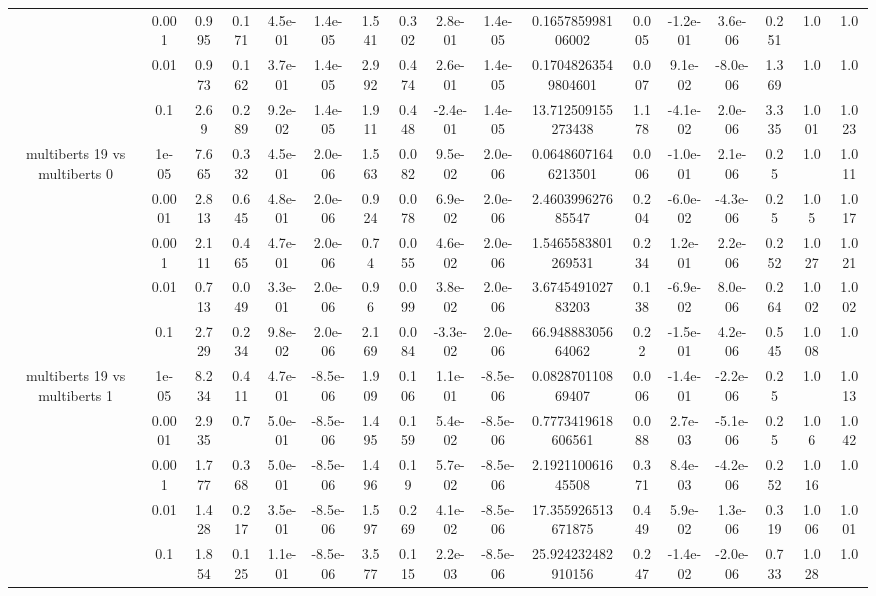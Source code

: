 \begin{tabular}{|c|c|c|c|c|c|c|c|c|c|c|c|c|c|c|c|c|}
 & 0.001 & 0.995 & 0.171 & 4.5e-01 & 1.4e-05 & 1.541 & 0.302 & 2.8e-01 & 1.4e-05 & 0.165785998106002 & 0.005 & -1.2e-01 & 3.6e-06 & 0.251 & 1.0 & 1.0 \\
 & 0.01 & 0.973 & 0.162 & 3.7e-01 & 1.4e-05 & 2.992 & 0.474 & 2.6e-01 & 1.4e-05 & 0.17048263549804601 & 0.007 & 9.1e-02 & -8.0e-06 & 1.369 & 1.0 & 1.0 \\
 & 0.1 & 2.69 & 0.289 & 9.2e-02 & 1.4e-05 & 1.911 & 0.448 & -2.4e-01 & 1.4e-05 & 13.712509155273438 & 1.178 & -4.1e-02 & 2.0e-06 & 3.335 & 1.001 & 1.023 \\
\hline
\multirow{5}{*}{multiberts 19 vs multiberts 0} & 1e-05 & 7.665 & 0.332 & 4.5e-01 & 2.0e-06 & 1.563 & 0.082 & 9.5e-02 & 2.0e-06 & 0.06486071646213501 & 0.006 & -1.0e-01 & 2.1e-06 & 0.25 & 1.0 & 1.011 \\
 & 0.0001 & 2.813 & 0.645 & 4.8e-01 & 2.0e-06 & 0.924 & 0.078 & 6.9e-02 & 2.0e-06 & 2.460399627685547 & 0.204 & -6.0e-02 & -4.3e-06 & 0.25 & 1.05 & 1.017 \\
 & 0.001 & 2.111 & 0.465 & 4.7e-01 & 2.0e-06 & 0.74 & 0.055 & 4.6e-02 & 2.0e-06 & 1.5465583801269531 & 0.234 & 1.2e-01 & 2.2e-06 & 0.252 & 1.027 & 1.021 \\
 & 0.01 & 0.713 & 0.049 & 3.3e-01 & 2.0e-06 & 0.96 & 0.099 & 3.8e-02 & 2.0e-06 & 3.674549102783203 & 0.138 & -6.9e-02 & 8.0e-06 & 0.264 & 1.002 & 1.002 \\
 & 0.1 & 2.729 & 0.234 & 9.8e-02 & 2.0e-06 & 2.169 & 0.084 & -3.3e-02 & 2.0e-06 & 66.94888305664062 & 0.22 & -1.5e-01 & 4.2e-06 & 0.545 & 1.008 & 1.0 \\
\hline
\multirow{5}{*}{multiberts 19 vs multiberts 1} & 1e-05 & 8.234 & 0.411 & 4.7e-01 & -8.5e-06 & 1.909 & 0.106 & 1.1e-01 & -8.5e-06 & 0.082870110869407 & 0.006 & -1.4e-01 & -2.2e-06 & 0.25 & 1.0 & 1.013 \\
 & 0.0001 & 2.935 & 0.7 & 5.0e-01 & -8.5e-06 & 1.495 & 0.159 & 5.4e-02 & -8.5e-06 & 0.7773419618606561 & 0.088 & 2.7e-03 & -5.1e-06 & 0.25 & 1.06 & 1.042 \\
 & 0.001 & 1.777 & 0.368 & 5.0e-01 & -8.5e-06 & 1.496 & 0.19 & 5.7e-02 & -8.5e-06 & 2.192110061645508 & 0.371 & 8.4e-03 & -4.2e-06 & 0.252 & 1.016 & 1.0 \\
 & 0.01 & 1.428 & 0.217 & 3.5e-01 & -8.5e-06 & 1.597 & 0.269 & 4.1e-02 & -8.5e-06 & 17.355926513671875 & 0.449 & 5.9e-02 & 1.3e-06 & 0.319 & 1.006 & 1.001 \\
 & 0.1 & 1.854 & 0.125 & 1.1e-01 & -8.5e-06 & 3.577 & 0.115 & 2.2e-03 & -8.5e-06 & 25.924232482910156 & 0.247 & -1.4e-02 & -2.0e-06 & 0.733 & 1.028 & 1.0 \\

\end{tabular}
